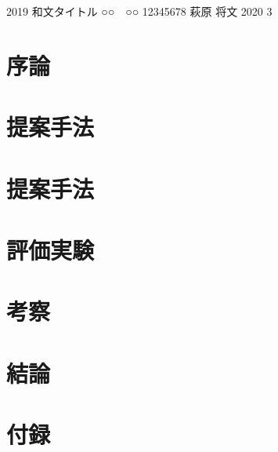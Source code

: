 \documentclass[a4j,12pt]{jreport}
\begin{document}
\begin{titlepage}
\thesis
{2019}                %
{和文タイトル}       %
{○○　○○}                %
{12345678}          %
{萩原 将文}         %
{2020}                %
{3} %
\end{titlepage}


\renewcommand{\thepage}{--\roman{page}--}

\jabstract


\eabstract{} %


\contents


\chapter{序論}


\chapter{提案手法}


\chapter{提案手法}


\chapter{評価実験}


\chapter{考察}


\chapter{結論}




\acknowledgment





\appendix
\chapter{付録}

\end{document}
